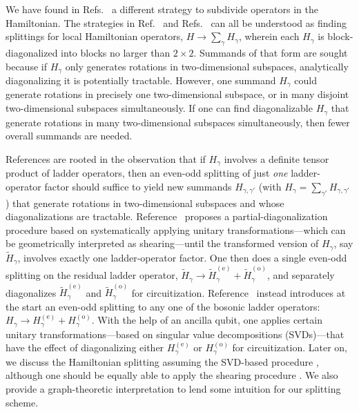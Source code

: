 \documentclass[aps,prd,twocolumn,showpacs,groupedaddress,superscriptaddress,nofootinbib,floatfix,preprintnumbers,longbibliography]{revtex4-1}
\begin{document}
We have found in Refs.~\cite{Stryker:2021asy,Davoudi:2022xmb} a different strategy to subdivide operators in the Hamiltonian. The strategies in Ref.~\cite{Kan:2021xfc} and Refs.~\cite{Stryker:2021asy,Davoudi:2022xmb} can all be understood as finding splittings for local Hamiltonian operators, $H\to \sum_{\gamma} H_\gamma$, wherein each $H_\gamma$ is block-diagonalized into blocks no larger than $2\times2$. Summands of that form are sought because if $H_\gamma$ only generates rotations in two-dimensional subspaces, analytically diagonalizing it is potentially tractable. However, one summand $H_\gamma$ could generate rotations in precisely one two-dimensional subspace, or in many disjoint two-dimensional subspaces simultaneously. If one can find diagonalizable $H_\gamma$ that generate rotations in many two-dimensional subspaces simultaneously, then fewer overall summands are needed.

References \cite{Stryker:2021asy,Davoudi:2022xmb} are rooted in the observation that if $H_\gamma$ involves a definite tensor product of ladder operators, then an even-odd splitting of just \emph{one} ladder-operator factor should suffice to yield new summands $H_{\gamma,\gamma'}$ (with $H_\gamma=\sum_{\gamma'}H_{\gamma,\gamma'}$) that generate rotations in two-dimensional subspaces and whose diagonalizations are tractable.
Reference~\cite{Stryker:2021asy} proposes a partial-diagonalization procedure based on systematically applying unitary transformations---which can be geometrically interpreted as shearing---until the transformed version of $H_\gamma$, say $\tilde{H}_\gamma$, involves exactly one ladder-operator factor. One then does a single even-odd splitting on the residual ladder operator, $\tilde{H}_\gamma\to\tilde{H}^\mathrm{(e)}_\gamma+\tilde{H}^\mathrm{(o)}_\gamma$, and separately diagonalizes $\tilde{H}^\mathrm{(e)}_\gamma$ and $\tilde{H}^\mathrm{(o)}_\gamma$ for circuitization. Reference~\cite{Davoudi:2022xmb} instead introduces at the start an even-odd splitting to any one of the bosonic ladder operators: $H_\gamma\to H^\mathrm{(e)}_\gamma + H^\mathrm{(o)}_\gamma$. With the help of an ancilla qubit, one applies certain unitary transformations---based on singular value decompositions (SVDs)---that have the effect of diagonalizing either $H^\mathrm{(e)}_\gamma$ or $H^\mathrm{(o)}_\gamma$ for circuitization. Later on, we discuss the Hamiltonian splitting assuming the SVD-based procedure \cite{Davoudi:2022xmb}, although one should be equally able to apply the shearing procedure \cite{Stryker:2021asy}.
We also provide a graph-theoretic interpretation to lend some intuition for our splitting scheme.
\end{document}
